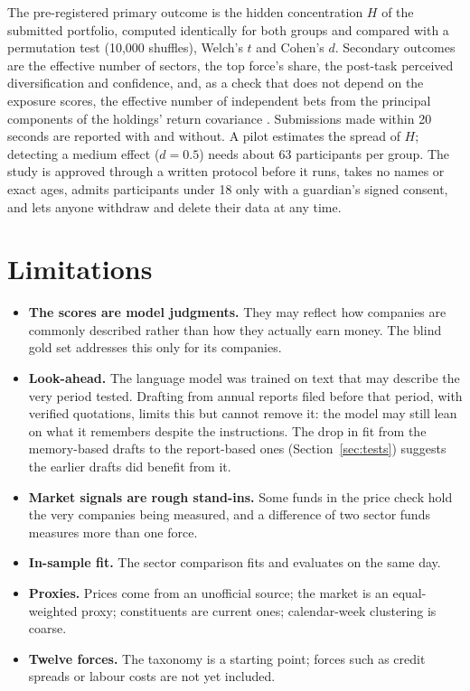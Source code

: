 \documentclass[11pt]{article}
\begin{document}
The pre-registered primary outcome is the hidden concentration $H$ of the submitted portfolio, computed identically for both groups and compared with a permutation test (10{,}000 shuffles), Welch's $t$ and Cohen's $d$. Secondary outcomes are the effective number of sectors, the top force's share, the post-task perceived diversification and confidence, and, as a check that does not depend on the exposure scores, the effective number of independent bets from the principal components of the holdings' return covariance \citep{meucci2009}. Submissions made within 20 seconds are reported with and without. A pilot estimates the spread of $H$; detecting a medium effect ($d = 0.5$) needs about 63 participants per group. The study is approved through a written protocol before it runs, takes no names or exact ages, admits participants under 18 only with a guardian's signed consent, and lets anyone withdraw and delete their data at any time.

\section{Limitations}

\begin{itemize}
  \item \textbf{The scores are model judgments.} They may reflect how companies are commonly described rather than how they actually earn money. The blind gold set addresses this only for its \goldSize{} companies.
  \item \textbf{Look-ahead.} The language model was trained on text that may describe the very period tested. Drafting from annual reports filed before that period, with verified quotations, limits this but cannot remove it: the model may still lean on what it remembers despite the instructions. The drop in fit from the memory-based drafts to the report-based ones (Section~\ref{sec:tests}) suggests the earlier drafts did benefit from it.
  \item \textbf{Market signals are rough stand-ins.} Some funds in the price check hold the very companies being measured, and a difference of two sector funds measures more than one force.
  \item \textbf{In-sample fit.} The sector comparison fits and evaluates on the same day.
  \item \textbf{Proxies.} Prices come from an unofficial source; the market is an equal-weighted proxy; constituents are current ones; calendar-week clustering is coarse.
  \item \textbf{Twelve forces.} The taxonomy is a starting point; forces such as credit spreads or labour costs are not yet included.
\end{itemize}
\end{document}
